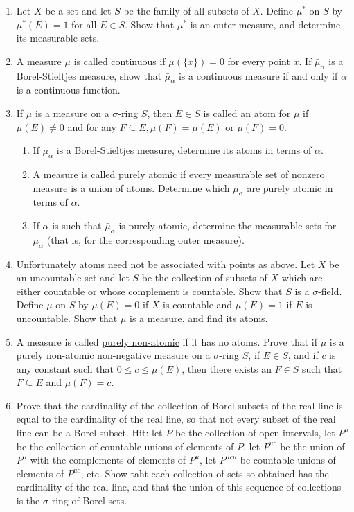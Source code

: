 \begin{enumerate}[label=\arabic*)]
\item Let $X$ be a set and let ${S}$ be the family of all subsets of $X$. Define $\mu^*$ on ${S}$ by $\mu^*(E)=1$ for all $E \in {S}$. Show that $\mu^*$ is an outer measure, and determine its measurable sets.

\item A measure $\mu$ is called continuous if $\mu(\{x\})=0$ for every point ${x}$. If $\bar{\mu}_\alpha$ is a Borel-Stieltjes measure, show that $\bar{\mu}_\alpha$ is a continuous measure if and only if $\alpha$ is a continuous function.

\item If $\mu$ is a measure on a $\sigma$-ring $S$, then $E \in S$ is called an atom for $\mu$ if $\mu(E) \neq 0$ and for any $F \subseteq E, \mu(F)=\mu(E)$ or $\mu(F)=0$.
\begin{enumerate}
\item If $\bar{\mu}_\alpha$ is a Borel-Stieltjes measure, determine its atoms in terms of $\alpha$.
\item A measure is called \underline{purely atomic} if every measurable set of nonzero measure is a union of atoms. Determine which $\bar{\mu}_\alpha$ are purely atomic in terms of $\alpha$.
\item If $\alpha$ is such that $\bar{\mu}_\alpha$ is purely atomic, determine the measurable sets for $\bar{\mu}_\alpha$ (that is, for the corresponding outer measure).
\end{enumerate}


\item Unfortunately atoms need not be associated with points as above. Let ${X}$ be an uncountable set and let ${S}$ be the collection of subsets of ${X}$ which are either countable or whose complement is countable. Show that ${S}$ is a $\sigma$-field. Define $\mu$ on ${S}$ by $\mu(E)=0$ if ${X}$ is countable and $\mu(E)=1$ if $E$ is uncountable. Show that $\mu$ is a measure, and find its atoms.

\item A measure is called \underline{purely non-atomic} if it has no atoms. Prove that if $\mu$ is a purely non-atomic non-negative measure on a $\sigma$-ring $S$, if $E \in S$, and if $c$ is any constant such that $0 \leq c \leq \mu(E)$, then there exists an $F \in S$ such that $F \subseteq E$ and $\mu(F)=c$.

\item Prove that the cardinality of the collection of Borel subsets of the real line is equal to the cardinality of the real line, so that not every subset of the real line can be a Borel subset. Hit: let $P$ be the collection of open intervals, let $P^u$ be the collection of countable unions of elements of $P$, let $P^{uc}$ be the union of $P^u$ with the complements of elements of $P^u$, let $P^{ucu}$ be countable unions of elements of $P^{uc}$, etc. Show taht each collection of sets so obtained has the cardinality of the real line, and that the union of this sequence of collections is the $\sigma$-ring of Borel sets.


\end{enumerate}
